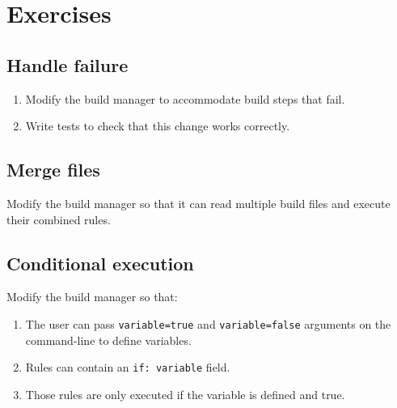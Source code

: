 \documentclass{scrbook}
\begin{document}
\section{Exercises}\label{builder-exercises}

\subsection*{Handle failure}

\begin{enumerate}

\item 

Modify the build manager to accommodate build steps that fail.



\item 

Write tests to check that this change works correctly.



\end{enumerate}

\subsection*{Merge files}


Modify the build manager so that it can read multiple build files
and execute their combined rules.

\subsection*{Conditional execution}


Modify the build manager so that:

\begin{enumerate}

\item 

The user can pass \texttt{variable=true} and \texttt{variable=false} arguments on the command-line
    to define variables.



\item 

Rules can contain an \texttt{if: variable} field.



\item 

Those rules are only executed if the variable is defined and true.



\end{enumerate}
\end{document}
